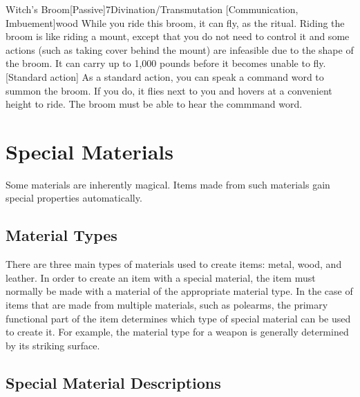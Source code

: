         \begin{magicitemdef}{Witch's Broom}[Passive]{7}{Divination/Transmutation [Communication, Imbuement]}{wood}
             While you ride this broom, it can fly, as the  ritual.
            Riding the broom is like riding a mount, except that you do not need to control it and some actions (such as taking cover behind the mount) are infeasible due to the shape of the broom.
            It can carry up to 1,000 pounds before it becomes unable to fly.
            [Standard action] As a standard action, you can speak a command word to summon the broom.
            If you do, it flies next to you and hovers at a convenient height to ride.
            The broom must be able to hear the commmand word.
        \end{magicitemdef}

\section{Special Materials}

    Some materials are inherently magical.
    Items made from such materials gain special properties automatically.

    \subsection{Material Types}
        There are three main types of materials used to create items: metal, wood, and leather.
        In order to create an item with a special material, the item must normally be made with a material of the appropriate material type.
        In the case of items that are made from multiple materials, such as polearms, the primary functional part of the item determines which type of special material can be used to create it.
        For example, the material type for a weapon is generally determined by its striking surface.

    \subsection{Special Material Descriptions}

